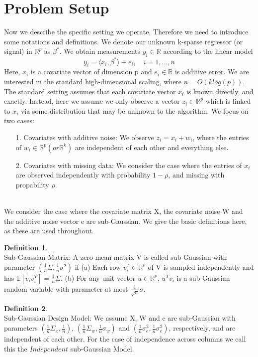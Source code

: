 \documentclass[a4paper,10pt]{article}
\theoremstyle{definition}
\newtheorem{definition}{Definition}
\begin{document}
\section{Problem Setup}
Now we describe the specific setting we operate. Therefore we need to introduce some notations and definitions.
We denote our unknown k-sparse regressor (or signal) in $\mathbb{R}^p$ as $\beta^*$. We obtain measurements $y_i\in \mathbb{R}$ according to the linear model
\begin{equation*}
	y_i = \langle x_i,\beta^*\rangle + e_i, \quad	i=1,...,n
\end{equation*}
Here, $x_i$ is a covariate vector of dimension p and $e_i \in \mathbb{R}$ is additive error. We are interested in the standard high-dimensional scaling, where $n=O(klog(p))$.\\
The standard setting assumes that each covariate vector $x_i$ is known directly, and exactly. Instead, here we assume we only observe a vector $z_i \in \mathbb{R}^p$ which is linked to $x_i$ via some distribution that may be unknown to the algorithm. We focus on two cases:\\
\begin{itemize}
	\item[1.] Covariates with additive noise: We observe $z_i=x_i+w_i$, where the entries of $w_i \in \mathbb{R}^p(or \mathbb{R}^k)$ are independent of each other and everything else.
	\item[2.] Covariates with missing data: We consider the case where the entries of $x_i$ are observed independently with probability $1-\rho$, and missing with propability $\rho$.
\end{itemize}
\ \\
We consider the case where the covariate matrix X, the covariate noise W and the additive noise vector e are sub-Gaussian. We give the basic definitions here, as these are used throughout.

\begin{definition}\ \\
	Sub-Gaussian Matrix: A zero-mean matrix V is called sub-Gaussian with parameter $(\frac{1}{n}\Sigma,\frac{1}{n}\sigma^2)$ if (a) Each row $v_i^T \in \mathbb{R}^p$ of V is sampled independently and has $\mathbb{E}[v_iv_i^T]=\frac{1}{n}\Sigma$. (b) For any unit vector $u \in \mathbb{R}^p$, $u^Tv_i$ is a sub-Gaussian random variable with parameter at most $\frac{1}{\sqrt{n}}\sigma$.
\end{definition}

\begin{definition}\ \\
	Sub-Gaussian Design Model: We assume X, W and e are sub-Gaussian with parameters $(\frac{1}{n}\Sigma_x,\frac{1}{n})$, $(\frac{1}{n}\Sigma_w, \frac{1}{n}\sigma_w)$ and $(\frac{1}{n}\sigma_e^2, \frac{1}{n}\sigma_e^2)$, respectively, and are independent of each other. For the case of independence across columns we call this the $Independent$ sub-Gaussian Model.
\end{definition}
\end{document}
